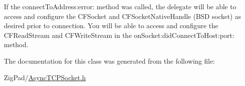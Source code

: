 If the connectToAddress:error: method was called, the delegate will be able to access and configure the CFSocket and CFSocketNativeHandle (BSD socket) as desired prior to connection. You will be able to access and configure the CFReadStream and CFWriteStream in the onSocket:didConnectToHost:port: method. 

The documentation for this class was generated from the following file:\begin{DoxyCompactItemize}
\item 
ZigPad/\hyperlink{_async_t_c_p_socket_8h}{AsyncTCPSocket.h}\end{DoxyCompactItemize}
